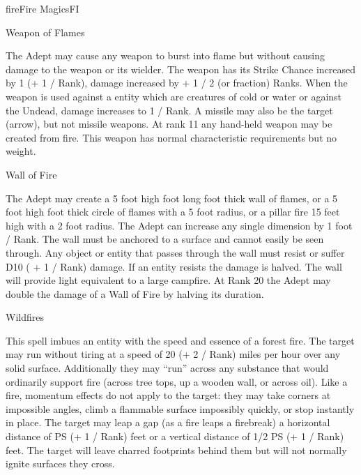 \begin{college}[2.0]{fire}{Fire Magics}{FI}
\begin{spell}[S-12]{Weapon of Flames}
\begin{effects}
The Adept may cause any weapon to burst into flame but without causing
damage to the weapon or its wielder. The weapon has its Strike Chance
increased by 1 (+ 1 / Rank), damage increased by + 1 / 2 (or fraction)
Ranks. When the weapon is used against a entity which are creatures of
cold or water or against the Undead, damage increases to 1 / Rank. A
missile may also be the target (\eg arrow), but not missile weapons.
At rank 11 any hand-held weapon may be created from fire. This weapon
has normal characteristic requirements but no weight.
\end{effects}
\end{spell}

\begin{spell}[S-13]{Wall of Fire}
\begin{effects}
The Adept may create a 5 foot high  foot long  foot thick
wall of flames, or a 5 foot high  foot thick circle of flames with
a 5 foot radius, or a pillar fire 15 feet high with a 2 foot radius.
The Adept can increase any single dimension by 1 foot / Rank. The wall
must be anchored to a surface and cannot easily be seen through. Any
object or entity that passes through the wall must resist or suffer
D10 ( + 1 / Rank) damage. If an entity resists the damage is halved.
The wall will provide light equivalent to a large campfire. At Rank 20
the Adept may double the damage of a Wall of Fire by halving its
duration.
\end{effects}
\end{spell}

\begin{spell}[S-14]{Wildfires}
\begin{effects}
This spell imbues an entity with the speed and essence of a forest
fire. The target may run without tiring at a speed of 20 (+ 2 / Rank)
miles per hour over any solid surface.  Additionally they may ``run''
across any substance that would ordinarily support fire (\eg across
tree tops, up a wooden wall, or across oil). Like a fire, momentum
effects do not apply to the target: they may take corners at
impossible angles, climb a flammable surface impossibly quickly, or
stop instantly in place. The target may leap a gap (as a fire leaps a
firebreak) a horizontal distance of PS (+ 1 / Rank) feet or a vertical
distance of 1/2 PS (+ 1 / Rank) feet. The target will leave charred
footprints behind them but will not normally ignite surfaces they
cross.


\end{effects}
\end{spell}
\end{college}
